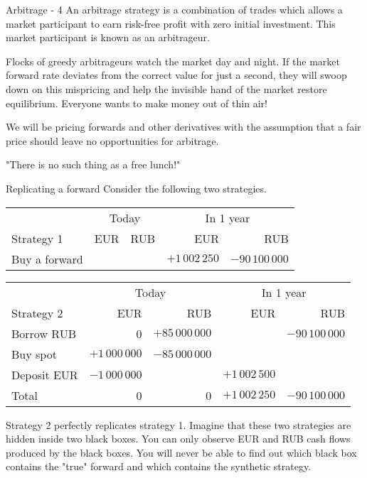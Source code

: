 \documentclass{beamer}
\begin{document}
\begin{frame}{Arbitrage - 4}
\justify
An \alert{arbitrage strategy} is a combination of trades which allows a market participant to earn risk-free profit with zero initial investment. This market participant is known as an \alert{arbitrageur}.

\justify
Flocks of greedy arbitrageurs watch the market day and night. If the market forward rate deviates from the correct value for just a second, they will swoop down on this mispricing and help the invisible hand of the market restore equilibrium. Everyone wants to make money out of thin air!

\justify
We will be pricing forwards and other derivatives with the assumption that a fair price should leave no opportunities for arbitrage.

\justify
"There is no such thing as a free lunch!"
\end{frame}



\begin{frame}{Replicating a forward}
\justify
Consider the following two strategies.

\justify
\small{
\begin{tabular}{l|r|r|r|r}
 & \multicolumn{2}{c|}{Today} & \multicolumn{2}{c}{In 1 year} \\ \cline{2-5}
Strategy  1& EUR & RUB & EUR & RUB \\ \hline
Buy a forward &                              &                                & $+1\,002\,250$ & $-90\,100\,000$
\end{tabular}
}

\justify
\small{
\begin{tabular}{l|r|r|r|r}
& \multicolumn{2}{c|}{Today} & \multicolumn{2}{c}{In 1 year} \\ \cline{2-5}
Strategy 2 & EUR & RUB & EUR & RUB \\ \hline
Borrow RUB & 0                            & $+85\,000\,000$ &                    & $-90\,100\,000$ \\
Buy spot        & $+1\,000\,000$ & $-85\,000\,000$  &                     &                                  \\
Deposit EUR & $-1\,000\,000$  &                                  & $+1\,002\,500$ & \\  \hline
Total & 0 & 0 &  $+1\,002\,250$ & $-90\,100\,000$
\end{tabular}
}

\justify
Strategy 2 perfectly \alert{replicates} strategy 1. Imagine that these two strategies are hidden inside two black boxes. You can only observe EUR and RUB cash flows produced by the black boxes. You will never be able to find out which black box contains the "true" forward and which contains the synthetic strategy.
\end{frame}
\end{document}
